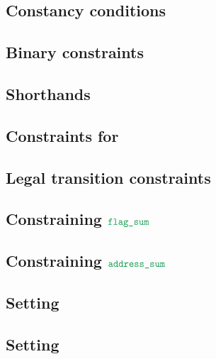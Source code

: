 \subsection{Constancy conditions}                             \label{bls: generalities: constancy conditions}               
\subsection{Binary constraints}                               \label{bls: generalities: binary}                             
\subsection{Shorthands}                                       \label{bls: generalities: shorthands}                         
\subsection{Constraints for \blsStamp{}}                      \label{bls: generalities: stamp}                              
\subsection{Legal transition constraints}                     \label{bls: generalities: legal transitions}                  
\subsection{Constraining $\locFlagSum$}                       \label{bls: generalities: flag sum}                           
\subsection{Constraining $\locAddressSum$}                    \label{bls: generalities: address sum}                        
\subsection{Setting \blsPhase{}}                              \label{bls: generalities: setting phase}                      
\subsection{Setting \indexMax{}}                              \label{bls: generalities: setting index max}                  
